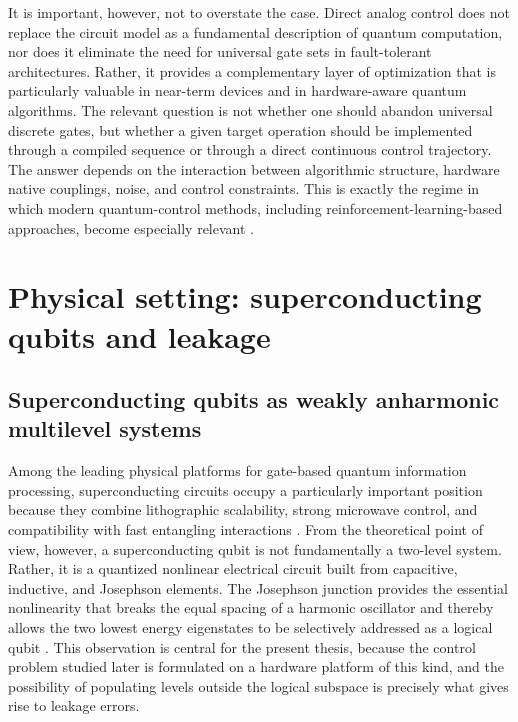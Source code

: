 It is important, however, not to overstate the case. Direct analog control does not replace the circuit model as a fundamental description of quantum computation, nor does it eliminate the need for universal gate sets in fault-tolerant architectures. Rather, it provides a complementary layer of optimization that is particularly valuable in near-term devices and in hardware-aware quantum algorithms. The relevant question is not whether one should abandon universal discrete gates, but whether a given target operation should be implemented through a compiled sequence or through a direct continuous control trajectory. The answer depends on the interaction between algorithmic structure, hardware native couplings, noise, and control constraints. This is exactly the regime in which modern quantum-control methods, including reinforcement-learning-based approaches, become especially relevant \cite{Niu2019,Koch2022}.


\section{Physical setting: superconducting qubits and leakage}
\subsection{Superconducting qubits as weakly anharmonic multilevel systems}
\label{subsec:superconducting_qubits_multilevel}

Among the leading physical platforms for gate-based quantum information processing, superconducting circuits occupy a particularly important position because they combine lithographic scalability, strong microwave control, and compatibility with fast entangling interactions \cite{Krantz2019,Kjaergaard2020}. From the theoretical point of view, however, a superconducting qubit is not fundamentally a two-level system. Rather, it is a quantized nonlinear electrical circuit built from capacitive, inductive, and Josephson elements. The Josephson junction provides the essential nonlinearity that breaks the equal spacing of a harmonic oscillator and thereby allows the two lowest energy eigenstates to be selectively addressed as a logical qubit \cite{Koch2007,Krantz2019}. This observation is central for the present thesis, because the control problem studied later is formulated on a hardware platform of this kind, and the possibility of populating levels outside the logical subspace is precisely what gives rise to leakage errors.

